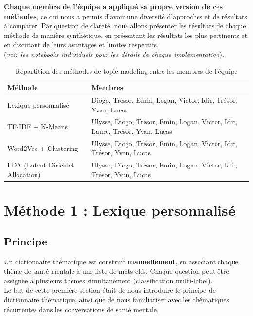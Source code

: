 \documentclass[12pt,a4paper]{report}
\begin{document}
\begin{note}
\textbf{Chaque membre de l'équipe a appliqué sa propre version de ces méthodes}, ce qui nous a permis d'avoir une diversité d'approches et de résultats à comparer.
Par question de clareté, nous allons présenter les résultats de chaque méthode de manière synthétique, en présentant les résultats les plus pertinents et en discutant de leurs avantages et limites respectifs.\\
(\textit{voir les notebooks\footnotemark{} individuels pour les détails de chaque implémentation}).
\end{note}

\begin{table}[H]
\begin{center}
\begin{tabular}{@{}lL{6cm}@{}}
\toprule
\textbf{Méthode} & \textbf{Membres} \\
\midrule
Lexique personnalisé & Diogo, Trésor, Emin, Logan, Victor, Idir, Trésor, Yvan, Lucas \\
\midrule
TF-IDF + K-Means & Ulysse, Diogo, Trésor, Emin, Logan, Victor, Idir, Laure, Trésor, Yvan, Lucas\\
\midrule
Word2Vec + Clustering & Ulysse, Diogo, Trésor, Emin, Logan, Victor, Idir, Trésor, Yvan, Lucas \\
\midrule
LDA (Latent Dirichlet Allocation) & Ulysse, Diogo, Trésor, Emin, Logan, Victor, Idir, Trésor, Yvan, Lucas \\
\bottomrule
\end{tabular}
\caption{Répartition des méthodes de topic modeling entre les membres de l'équipe}
\end{center}
\end{table}

\pagebreak

\section{Méthode 1 : Lexique personnalisé}

\subsection{Principe}

Un dictionnaire thématique est construit \textbf{manuellement}, en associant chaque thème de santé mentale 
à une liste de mots-clés. Chaque question peut être assignée à plusieurs thèmes simultanément 
(classification multi-label).\\
Le but de cette première section était de nous introduire le principe de dictionnaire thématique,
ainsi que de nous familiariser avec les thématiques récurrentes dans les conversations de santé mentale.
\end{document}
